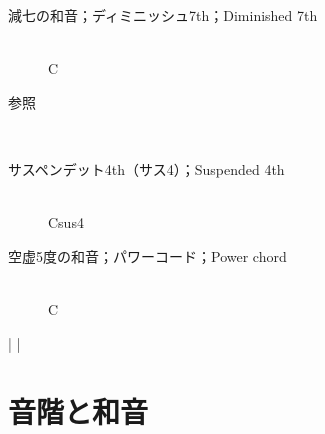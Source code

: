\documentclass[dvipdfmx,uplatex,b5paper,openany,jbase=12Q,nomag*,textwidth-limit=44%
               ]{gachimuchi}
\begin{document}
\begin{description}
\begin{description}
    \item[減七の和音；ディミニッシュ7th；Diminished 7th] ~\\C\Dim{}
  \end{description}
  \item[五和音や六和音，テンションコード]参照
  \item[その他の和音]~
  \begin{description}
    \item[サスペンデット4th（サス4）；Suspended 4th] ~\\Csus4
    \item[空虚5度の和音；パワーコード；Power chord] ~\\C{}
  \end{description}
\end{description}

\begin{Music}[0.9\linewidth]
  \nostartrule%
  \Startpiece
  \Notes%
  \en\bar\Notes
  \en\Notes
  \en\bar\Notes
  \en%
  \endpiece%
\end{Music}

\mainmatter
\chapter{音階と和音}\vspace{-.5zh}%
\end{document}
